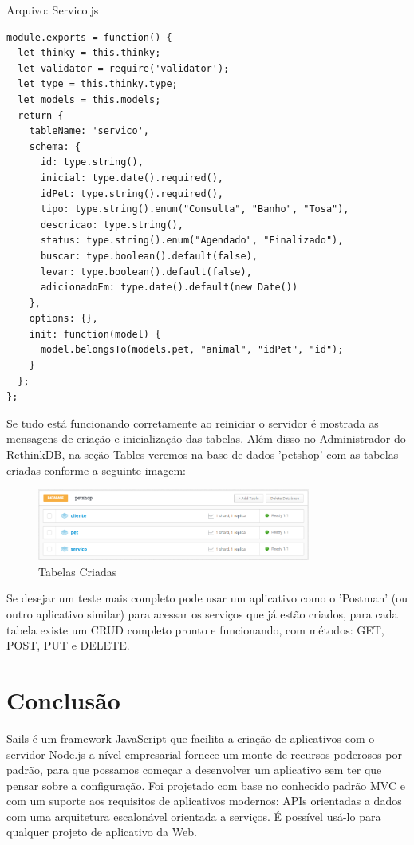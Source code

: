 \documentclass[a4paper,11pt]{article}
\begin{document}
{\ttfamily Arquivo: Servico.js}
\begin{lstlisting}
module.exports = function() {
  let thinky = this.thinky;
  let validator = require('validator');
  let type = this.thinky.type;
  let models = this.models;
  return {
    tableName: 'servico',
    schema: {
      id: type.string(),
      inicial: type.date().required(),
      idPet: type.string().required(),
      tipo: type.string().enum("Consulta", "Banho", "Tosa"),
      descricao: type.string(),
      status: type.string().enum("Agendado", "Finalizado"),
      buscar: type.boolean().default(false),
      levar: type.boolean().default(false),
      adicionadoEm: type.date().default(new Date())
    },
    options: {},
    init: function(model) {
      model.belongsTo(models.pet, "animal", "idPet", "id");
    }
  };
};
\end{lstlisting}

Se tudo está funcionando corretamente ao reiniciar o servidor é mostrada as mensagens de criação e inicialização das tabelas. Além disso no Administrador do RethinkDB, na seção Tables veremos na base de dados 'petshop' com as tabelas criadas conforme a seguinte imagem:
\begin{figure}[H]
	\centering
	\includegraphics[width=0.8\textwidth]{imagens/tabelas.png}
	\caption{Tabelas Criadas}
\end{figure}

Se desejar um teste mais completo pode usar um aplicativo como o 'Postman' (ou outro aplicativo similar) para acessar os serviços que já estão criados, para cada tabela existe um CRUD completo pronto e funcionando, com métodos: GET, POST, PUT e DELETE.

\section{Conclusão}
Sails é um framework JavaScript que facilita a criação de aplicativos com o servidor Node.js a nível empresarial fornece um monte de recursos poderosos por padrão, para que possamos começar a desenvolver um aplicativo sem ter que pensar sobre a configuração. Foi projetado com base no conhecido padrão MVC e com um suporte aos requisitos de aplicativos modernos: APIs orientadas a dados com uma arquitetura escalonável orientada a serviços. É possível usá-lo para qualquer projeto de aplicativo da Web.
\end{document}

